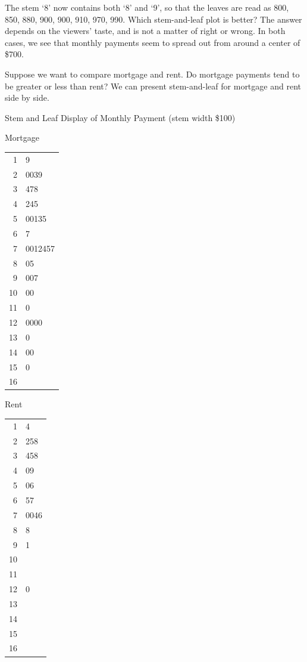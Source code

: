 \documentclass[11pt, chapterprefix=true]{scrbook}\usepackage[]{graphicx}\usepackage[]{color}
\begin{document}
The stem `8' now contains both `8' and `9', so that the leaves are read as 800, 850, 880, 900, 900, 910, 970, 990.  Which stem-and-leaf plot is better?  The answer depends on the viewers' taste, and is not a matter of right or wrong.  In both cases, we see that monthly payments seem to spread out from around a center of \$700.

Suppose we want to compare mortgage and rent.  Do mortgage payments tend to be greater or less than rent?  We can present stem-and-leaf for mortgage and rent side by side.

\newpage

Stem and Leaf Display of Monthly Payment (stem width \$100)

\begin{minipage}[ht]{3cm}

Mortgage

\begin{tabular}{@{} r|l @{}} \hline
1 & 9 \\
2 & 0039 \\
3 & 478 \\
4 & 245 \\
5 & 00135 \\
6 & 7 \\
7 & 0012457 \\
8 & 05 \\
9 & 007 \\
10& 00 \\
11& 0 \\
12& 0000 \\
13& 0 \\
14& 00 \\
15& 0 \\
16& \\ \hline
\end{tabular}
\end{minipage}
\begin{minipage}[ht]{4cm}

Rent

\begin{tabular}{@{} r|l @{}} \hline
1 & 4 \\
2 & 258 \\
3 & 458 \\
4 & 09 \\
5 & 06 \\
6 & 57 \\
7 & 0046 \\
8 & 8 \\
9 & 1 \\
10&  \\
11&  \\
12& 0 \\
13&  \\
14&  \\
15&  \\
16& \\ \hline
\end{tabular}
\end{minipage}
\end{document}
